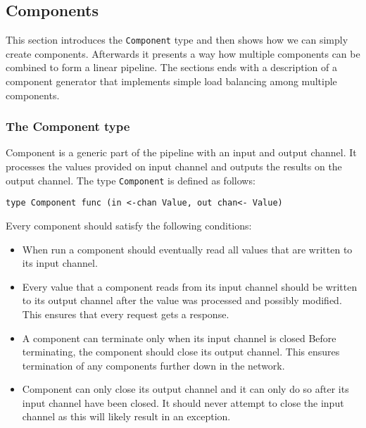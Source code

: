 \documentclass[12pt,a4paper]{article}
\begin{document}
\subsection{Components}
This section introduces the \texttt{Component} type and then shows how we can simply
create components. Afterwards it presents a way how multiple components can
be combined to form a linear pipeline. The sections ends with a description
of a component generator that implements simple load balancing among
multiple components.

\subsubsection{The Component type}
Component is a generic part of the pipeline with an input and output channel.
It processes the values provided on input channel and outputs the results
on the output channel. The type \texttt{Component} is defined as follows:
\begin{lstlisting}
type Component func (in <-chan Value, out chan<- Value)
\end{lstlisting}
Every component should satisfy the following conditions:
\begin{itemize}
    \item When run a component should eventually read all values that are
          written to its input channel.

    \item Every value that a component reads from its input channel
          should be written to its output channel after the value was processed
          and possibly modified. This ensures that every request gets a response.

    \item A component can terminate only when its input channel is closed 
          Before terminating, the component should close its output channel.
          This ensures termination of any components further down in the network.

    \item Component can only close its output channel and it can only do so
    	  after its input channel have been closed. It should never attempt
          to close the input channel as this will likely result in an exception.
\end{itemize}
\end{document}
